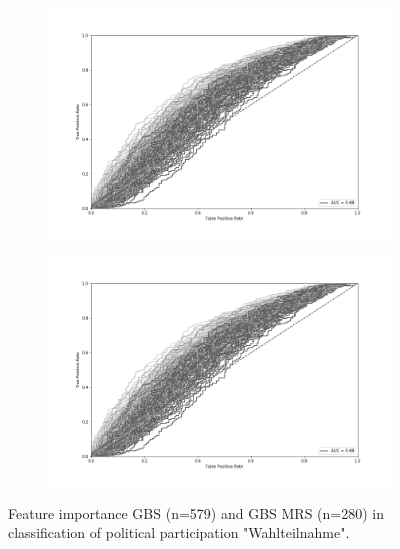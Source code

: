 \begin{figure}
\centering
\begin{subfigure}[b]{0.8\textwidth}
		\includegraphics[scale=0.42,angle=0]{fig/Roc_BFI-10}
   \label{fig:Ng1} 
\end{subfigure}

\begin{subfigure}[b]{0.8\textwidth}
		\includegraphics[scale=0.42,angle=0]{fig/Roc_BFI-10}
   \label{fig:Ng2}
\end{subfigure}
\vspace{0.35cm}
\caption{Feature importance GBS (n=579) and GBS MRS (n=280) in classification of political participation "Wahlteilnahme".}
\end{figure}


